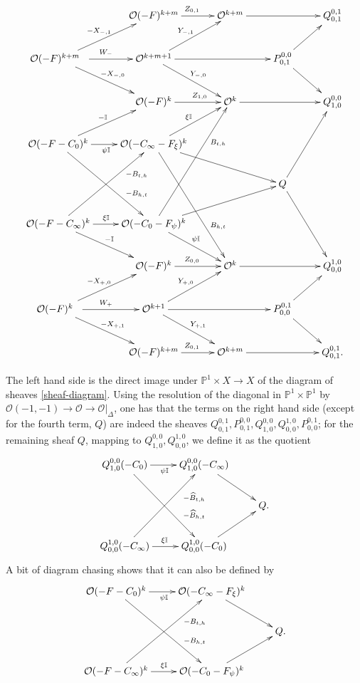\documentclass[12pt]{article}
\theoremstyle{definition}
\theoremstyle{remark}
\numberwithin{theorem}{section}
\def\bP{{\mathbb {P}}}
\def\bI{{\mathbb {I}}}
\def\pO{{\mathcal O}}
\begin{document}
    \begin{equation} \label{resolution-PQ-TN-9}\xymatrix{  
 & \pO(-F)^{k+m} \ar[r]^{Z_{ 0,1} } &\pO^{k+m}\ar[rr]& &Q_{0,1}^{0,1}\\
 \pO(-F)^{k+m}\ \  \ar[dr]^{-X_{-,0} }\ar[r]^{W_{ -}}\ar[ur]^{-X_{-,1} }& \pO^{k+m+1} \ar[dr]^{Y_{ -,0} }\ar[ur]^{Y_{ -,1} }\ar[rr]& &P_{0,1}^{0,0} \ar[ur]\ar[dr] \\ 
 &  \pO(-F)^{k } \ar[r]^(0.6){Z_{ 1,0}} &\pO^{k}\ar[rr]& &Q_{ 1,0}^{0,0} \\ 
  \pO(-F-C_0)^{k}\ar[ur]^{- \bI} \ar[ddr]^(0.7){-B_{h,t}}\ar[r]_(0.5){\psi\bI} &  \pO(-C_\infty-F_\xi)^{k}\ar[ur]^{\xi\bI}  \ar[rddd]^(0.7){ B_{h,t}} \ar[rrd] && \\
 &&&Q \ar[uur]  \ar[rdd]\\
   \pO(-F-C_\infty)^{k}\ar[dr]^{-\bI} \ar[uur]_(0.7){- B_{t,h}}\ar[r]^(0.5){\xi\bI} &  \pO(-C_0-F_\psi)^{k}\ar[dr]^{\psi\bI}  \ar[ruuu]_(0.7){ B_{t,h}}\ar[urr] & \\
 & \pO(-F)^{k }\ar[r]^{Z_{0,0}} &\pO^{k} \ar[rr]& &Q_{0 ,0}^{ 1,0} \\
 \pO(-F)^{k }\ \ \ar[dr]^{-X_{ +,1}  } \ar[r]^{W_{+}}\ar[ur]^{-X_{+,0} }&   \pO^{k+1}\ar[dr]^{Y_{+,1}}\ar[ur]^{Y_{+,0}}\ar[rr]& &P_{0,0}^{0,1}\ar[dr] \ar[ur]\\
 & \pO(-F)^{k+m} \ar[r]^{Z_{ 0,1} } &\pO^{k+m}\ar[rr]& &Q_{0,1}^{0,1}.
 }
\end{equation}

The left hand side is the direct image under $\bP^1\times X\rightarrow X$ of the diagram of sheaves \eqref{sheaf-diagram}. Using the  resolution of the diagonal in $\bP^1\times \bP^1$ by $\pO(-1,-1)\rightarrow \pO\rightarrow \pO|_\Delta$, one has that the terms on the right hand side (except for the fourth term, $Q$) are  indeed  the sheaves 
$Q_{0,1}^{0,1}, P_{0,1}^{0,0} , Q_{ 1,0}^{0,0},Q_{0 ,0}^{ 1,0} , P_{0,0}^{0,1}$; for the  remaining sheaf $Q$, mapping to $  Q_{ 1,0}^{0,0},   Q^{ 1,0}_{0,0}$, we define it as the quotient
  \begin{equation} \label{define-Q2}\xymatrix{  
  Q_{ 1,0}^{0,0}( -C_0)   \ar[ddr]^(0.7){ -\widehat B_{h,t}}\ar[r]_(0.5){\psi\bI} &  Q_{ 1,0}^{0,0}(-C_\infty )  \ar[rd]  \\
 &&Q. \\
Q_{0 ,0}^{ 1,0} (-C_\infty)  \ar[uur]_(0.7){-\widehat B_{t,h}}\ar[r]^(0.5){\xi\bI} &  Q_{0 ,0}^{ 1,0} (-C_0 )  \ar[ur] \\ }
\end{equation}
A bit of diagram chasing shows that it can also be defined  by 
    \begin{equation} \label{define-Q}\xymatrix{  
  \pO(-F-C_0)^{k}  \ar[ddr]^(0.7){ -B_{h,t}}\ar[r]_(0.5){\psi\bI} &  \pO(-C_\infty-F_\xi)^{k} \ar[rd]  \\
&&Q. \\
  \pO(-F-C_\infty)^{k} \ar[uur]_(0.7){ -B_{t,h}}\ar[r]^(0.5){\xi\bI} &  \pO(-C_0-F_\psi)^{k}\ar[ur] \\ }
\end{equation}
\end{document}
